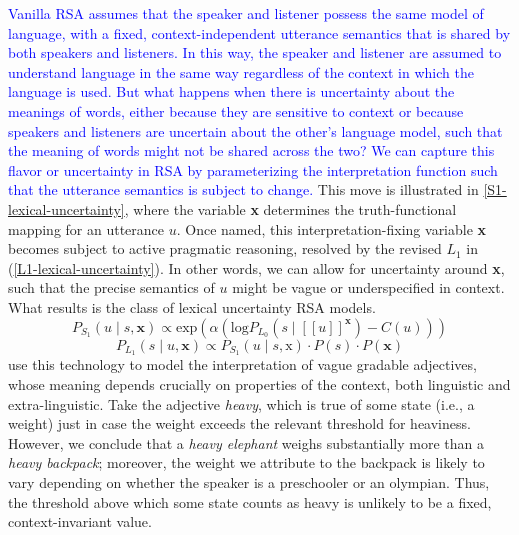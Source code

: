 \documentclass{sp}
\newcommand{\gs}[1]{\textcolor{blue}{#1}}
\newcommand{\mf}[1]{\textcolor{orange}{[mf: #1]}}
\newcommand{\mht}[1]{\textcolor{purple}{[mht: #1]}}
\newcommand{\sem}[1]{\ensuremath{[\![#1]\!]}}
\begin{document}
\gs{Vanilla RSA assumes that the speaker and listener possess the same model of language, with a fixed, context-independent utterance semantics that is shared by both speakers and listeners. In this way, the speaker and listener are assumed to understand language in the same way regardless of the context in which the language is used. But what happens when there is uncertainty about the meanings of words, either because they are sensitive to context or because speakers and listeners are uncertain about the other's language model, such that the meaning of words might not be shared across the two? We can capture this flavor or uncertainty in RSA by parameterizing the interpretation function such that the utterance semantics is subject to change.} This move is illustrated in \eqref{S1-lexical-uncertainty}, where the variable \textbf{x} determines the truth-functional mapping for an utterance $u$. Once named, this interpretation-fixing variable \textbf{x} becomes subject to active pragmatic reasoning, resolved by the revised $L_1$ in (\ref{L1-lexical-uncertainty}). In other words, we can allow for uncertainty around \textbf{x}, such that the precise semantics of $u$ might be vague or underspecified in context. What results is the class of lexical uncertainty RSA models. %
\begin{equation} \label{S1-lexical-uncertainty}
P_{S_1}(u\mid s, \textbf{x}) \propto \textrm{exp}(\alpha (\textrm{log}P_{L_0}(s\mid \sem{u}^{\textbf{x}}) - C(u))) 
\end{equation}
\begin{equation} \label{L1-lexical-uncertainty}
P_{L_1}(s \mid u, \textbf{x}) \propto P_{S_1}(u \mid s, \text{x}) \cdot P(s) \cdot P(\textbf{x})
\end{equation}
\cite{lassitergoodman2013} use this technology to model the interpretation of vague gradable adjectives, whose meaning depends crucially on properties of the context, both linguistic and extra-linguistic. Take the adjective \emph{heavy}, which is true of some state (i.e., a weight) just in case the weight exceeds the relevant threshold for heaviness. However, we conclude that a \emph{heavy elephant} weighs substantially more than a \emph{heavy backpack}; moreover, the weight we attribute to the backpack is likely to vary depending on whether the speaker is a preschooler or an olympian. Thus, the threshold above which some state counts as heavy is unlikely to be a fixed, context-invariant value.
\end{document}
